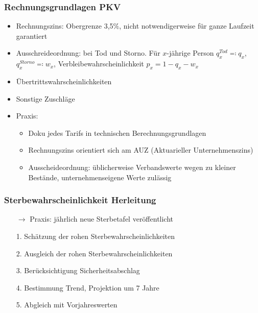 \documentclass[12pt]{report}
\theoremstyle{dotless}
\theoremstyle{definition}
\begin{document}
\subsubsection{Rechnungsgrundlagen PKV}
\begin{itemize}
	\item Rechnungszins: Obergrenze 3,5$\%$, nicht notwendigerweise für ganze Laufzeit garantiert
	\item Ausschreideordnung: bei Tod und Storno. Für $x$-jährige Person $q^{Tod}_x \eqqcolon q_x$, $q_x^{Storno} \eqqcolon w_x$, Verbleibewahrscheinlichkeit $p_x=1-q_x-w_x$
	\item Übertrittswahrscheinlichkeiten
	\item Sonstige Zuschläge
	\item Praxis: 
		\begin{itemize}
			\item Doku jedes Tarifs in technischen Berechnungsgrundlagen
			\item Rechnungszins orientiert sich am AUZ (Aktuarieller Unternehmenszins)
			\item Ausscheideordnung: üblicherweise Verbandswerte wegen zu kleiner Bestände, unternehmenseigene Werte zulässig
		\end{itemize}
\end{itemize}

\subsubsection{Sterbewahrscheinlichkeit Herleitung}
\begin{itemize}
	\item[$\rightarrow$] Praxis: jährlich neue Sterbetafel veröffentlicht
	\item[1.] Schätzung der rohen Sterbewahrscheinlichkeiten
	\item[2.] Ausgleich der rohen Sterbewahrscheinlichkeiten
	\item[3.] Berücksichtigung Sicherheitsabschlag
	\item[4.] Bestimmung Trend, Projektion um 7 Jahre
	\item[5.] Abgleich mit Vorjahreswerten 
\end{itemize}
\end{document}
